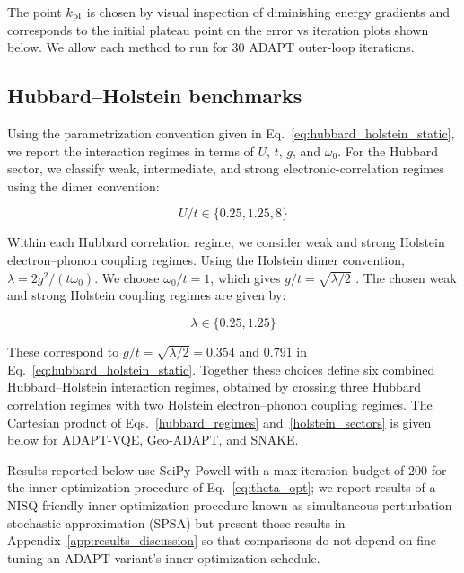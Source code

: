 \documentclass[
  reprint,
  amsmath,
  amssymb,
  aps,
  pra,
  nofootinbib,
  superscriptaddress,
  floatfix
]{revtex4-2}
\begin{document}
The point \(k_{\rm pl}\) is chosen by visual inspection of diminishing energy gradients and corresponds to the initial plateau point on the error vs iteration plots shown below. We allow each method to run for \(30\) ADAPT outer-loop iterations.



\subsection{Hubbard--Holstein benchmarks}
Using the parametrization convention given in Eq.~\eqref{eq:hubbard_holstein_static}, we report the interaction regimes in terms of \(U\), \(t\), \(g\), and \(\omega_0\).
For the Hubbard sector, we classify weak, intermediate, and strong electronic-correlation regimes using the dimer convention:

\begin{equation}
    U/t \in\{0.25,1.25,8\} \label{hubbard_regimes}
\end{equation}

Within each Hubbard correlation regime, we consider weak and strong Holstein electron--phonon coupling regimes. Using the Holstein dimer convention, \(\lambda=2g^2/(t\omega_0)\). We choose \(\omega_0/t=1\), which gives \(g/t=\sqrt{\lambda/2}\) \cite{Sakkinen2015HolsteinDimer}.
The chosen weak and strong Holstein coupling regimes are given by:

\begin{equation}
    \lambda\in\{0.25,1.25\} \label{holstein_sectors}
\end{equation}

These correspond to \(g/t=\sqrt{\lambda/2}=0.354\) and \(0.791\) in Eq.~\eqref{eq:hubbard_holstein_static}. Together these choices define six combined Hubbard--Holstein interaction regimes, obtained by crossing three Hubbard correlation regimes with two Holstein electron--phonon coupling regimes. The Cartesian product of Eqs.~\eqref{hubbard_regimes} and~\eqref{holstein_sectors} is given below for ADAPT-VQE, Geo-ADAPT, and SNAKE.


Results reported below use SciPy Powell with a max iteration budget of 200 for the inner optimization procedure of Eq.~\eqref{eq:theta_opt}; we report results of a NISQ-friendly inner optimization procedure known as simultaneous perturbation stochastic approximation (SPSA) but present those results in Appendix~\ref{app:results_discussion} so that comparisons do not depend on fine-tuning an ADAPT variant's inner-optimization schedule. 
\end{document}
